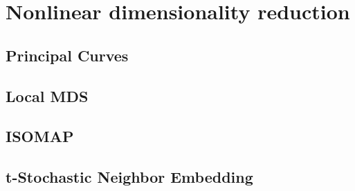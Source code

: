 \chapter{Nonlinear dimensionality reduction}

\section{Principal Curves}
\section{Local MDS}
\section{ISOMAP}
\section{t-Stochastic Neighbor Embedding}
